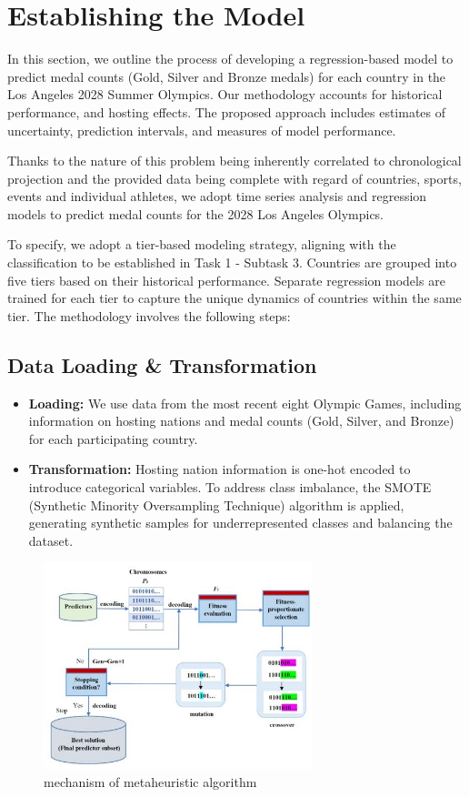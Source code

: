 \documentclass{mcmthesis}
\begin{document}
\section{Establishing the Model}

In this section, we outline the process of developing a regression-based model to predict medal counts (Gold, Silver and Bronze medals) for each country in the Los Angeles 2028 Summer Olympics. Our methodology accounts for historical performance, and hosting effects. The proposed approach includes estimates of uncertainty, prediction intervals, and measures of model performance.

Thanks to the nature of this problem being inherently correlated to chronological projection and the provided data being complete with regard of countries, sports, events and individual athletes, we adopt time series analysis and regression models to predict medal counts for the 2028 Los Angeles Olympics.

To specify, we adopt a tier-based modeling strategy, aligning with the classification to be established in Task 1 - Subtask 3. Countries are grouped into five tiers based on their historical performance. Separate regression models are trained for each tier to capture the unique dynamics of countries within the same tier. The methodology involves the following steps:

\subsection{Data Loading \& Transformation}

\begin{itemize}
    \item \textbf{Loading:} We use data from the most recent eight Olympic Games, including information on hosting nations and medal counts (Gold, Silver, and Bronze) for each participating country.
    \item \textbf{Transformation:} Hosting nation information is one-hot encoded to introduce categorical variables. To address class imbalance, the SMOTE (Synthetic Minority Oversampling Technique) algorithm is applied, generating synthetic samples for underrepresented classes and balancing the dataset.
\end{itemize}

\begin{figure}  %
    \centering
    \includegraphics[width=0.9\linewidth,height=6cm]{pics/Multi-Agent_Optimization_Algorithm.jpg}
    \caption{mechanism of metaheuristic algorithm}
    \label{fig:metaheuristic_algorithm}
\end{figure}
\end{document}
